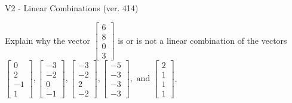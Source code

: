 \begin{exercise}
  \begin{exerciseTitle}V2 - Linear Combinations (ver. 414)\end{exerciseTitle}
  \begin{exerciseStatement}
    Explain why the vector \(\left[\begin{array}{c}
6 \\
8 \\
0 \\
3
\end{array}\right]\)  is or is not a linear 
	combination of the vectors \(\left[\begin{array}{c}
0 \\
2 \\
-1 \\
1
\end{array}\right] , \left[\begin{array}{c}
-3 \\
-2 \\
0 \\
-1
\end{array}\right] , \left[\begin{array}{c}
-3 \\
-2 \\
2 \\
-2
\end{array}\right] , \left[\begin{array}{c}
-5 \\
-3 \\
-3 \\
-3
\end{array}\right] , \text{ and } \left[\begin{array}{c}
2 \\
1 \\
1 \\
1
\end{array}\right]\).
	



\end{exerciseStatement}
\end{exercise}
